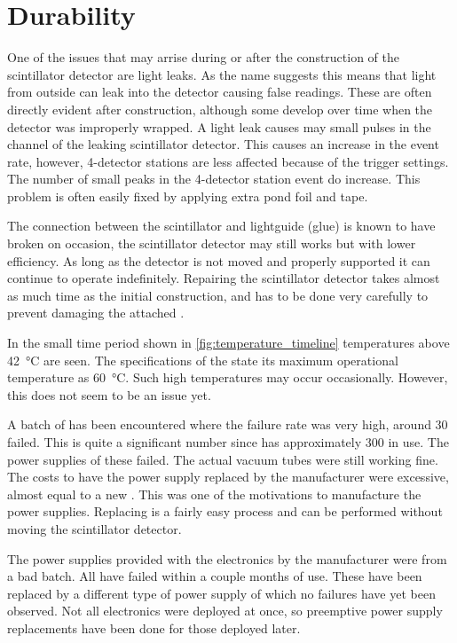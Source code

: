 \section{Durability}
\label{sec:detector-durability}

One of the issues that may arrise during or after the construction of the scintillator detector are light leaks. As the name suggests this means that light from outside can leak into the detector causing false readings. These are often directly evident after construction, although some develop over time when the detector was improperly wrapped. A light leak causes may small pulses in the channel of the leaking scintillator detector. This causes an increase in the event rate, however, 4-detector stations are less affected because of the trigger settings. The number of small peaks in the 4-detector station event do increase. This problem is often easily fixed by applying extra pond foil and tape.

The connection between the scintillator and lightguide (glue) is known to have broken on occasion, the scintillator detector may still works but with lower efficiency. As long as the detector is not moved and properly supported it can continue to operate indefinitely. Repairing the scintillator detector takes almost as much time as the initial construction, and has to be done very carefully to prevent damaging the attached \pmt.

In the small time period shown in \cref{fig:temperature_timeline} temperatures above \SI{42}{\degreeCelsius} are seen. The specifications of the \pmt state its maximum operational temperature as \SI{60}{\degreeCelsius}. Such high temperatures may occur occasionally. However, this does not seem to be an issue yet.

A batch of \pmts has been encountered where the failure rate was very high, around 30 \pmts failed. This is quite a significant number since \hisparc has approximately 300 \pmts in use. The power supplies of these \pmts failed. The actual vacuum tubes were still working fine. The costs to have the power supply replaced by the manufacturer were excessive, almost equal to a new \pmt. This was one of the motivations to manufacture the \nikhef \pmt power supplies. Replacing \pmts is a fairly easy process and can be performed without moving the scintillator detector.

The power supplies provided with the \hisparc electronics by the manufacturer were from a bad batch. All have failed within a couple months of use. These have been replaced by a different type of power supply of which no failures have yet been observed. Not all electronics were deployed at once, so preemptive power supply replacements have been done for those deployed later.


